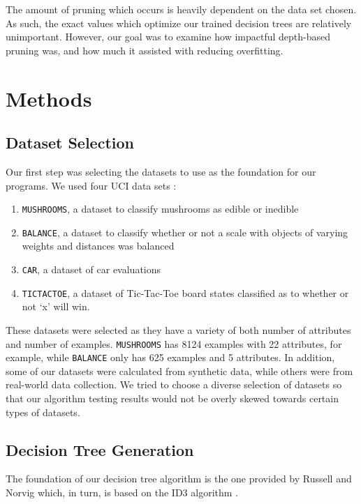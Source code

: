 \documentclass[screen, authorversion, nonacm, sigconf]{acmart}
\begin{document}
The amount of pruning which occurs is heavily dependent on the data set chosen. As such, the exact values which optimize our trained decision trees are relatively unimportant. However, our goal was to examine how impactful depth-based pruning was, and how much it assisted with reducing overfitting.

\section{Methods}

\subsection{Dataset Selection}

Our first step was selecting the datasets to use as the foundation for our programs. We used four UCI data sets \cite{Dua:2019}:

\begin{enumerate}
  \item \texttt{MUSHROOMS}, a dataset to classify mushrooms as edible or inedible
  \item \texttt{BALANCE}, a dataset to classify whether or not a scale with objects of varying weights and distances was balanced
  \item \texttt{CAR}, a dataset of car evaluations
  \item \texttt{TICTACTOE}, a dataset of Tic-Tac-Toe board states classified as to whether or not `x' will win.
\end{enumerate}

These datasets were selected as they have a variety of both number of attributes and number of examples. \texttt{MUSHROOMS} has 8124 examples with 22 attributes, for example, while \texttt{BALANCE} only has 625 examples and 5 attributes. In addition, some of our datasets were calculated from synthetic data, while others were from real-world data collection. We tried to choose a diverse selection of datasets so that our algorithm testing results would not be overly skewed towards certain types of datasets.

\subsection{Decision Tree Generation}

The foundation of our decision tree algorithm is the one provided by Russell and Norvig \cite{russell_norvig_2010} which, in turn, is based on the ID3 algorithm \cite{Quinlan1986}.
\end{document}
